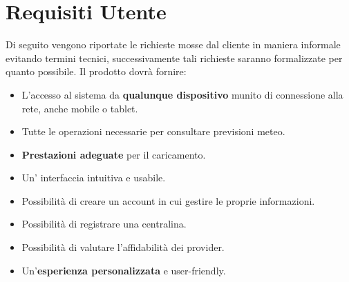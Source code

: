 	\section{Requisiti Utente}
	Di seguito vengono riportate le richieste mosse dal cliente in maniera informale evitando termini tecnici, successivamente tali richieste saranno formalizzate per quanto possibile.
	Il prodotto dovrà fornire: 
		\begin{itemize}
            \item L'accesso al sistema da \textbf{qualunque dispositivo} munito di connessione alla rete, anche mobile o tablet.
            \item Tutte le operazioni necessarie per consultare previsioni meteo.
            \item \textbf{Prestazioni adeguate} per il caricamento.
            \item Un' interfaccia intuitiva e usabile.
            \item Possibilità di creare un account in cui gestire le proprie informazioni.
            \item Possibilità di registrare una centralina.
            \item Possibilità di valutare l'affidabilità dei provider.
            \item Un'\textbf{esperienza personalizzata} e user-friendly.
        \end{itemize}
